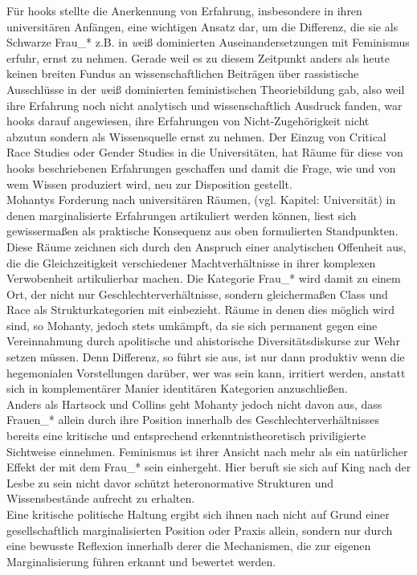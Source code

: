 Für hooks stellte die Anerkennung von Erfahrung, insbesondere in ihren
universitären Anfängen, eine wichtigen Ansatz dar, um die Differenz, die sie
als Schwarze Frau\_* z.B. in \textit{w}eiß dominierten Auseinandersetzungen mit
Feminismus erfuhr, ernst zu nehmen. Gerade weil es zu diesem Zeitpunkt anders
als heute keinen breiten Fundus an wissenschaftlichen Beiträgen über
rassistische Ausschlüsse in der \textit{w}eiß dominierten feministischen Theoriebildung
gab, also weil ihre Erfahrung noch nicht analytisch und wissenschaftlich
Ausdruck fanden, war hooks darauf angewiesen, ihre Erfahrungen von
Nicht-Zugehörigkeit nicht abzutun sondern als Wissensquelle ernst zu
nehmen.\footnotemark {}
Der Einzug von Critical Race Studies oder Gender Studies in die Universitäten,
hat Räume für diese von hooks beschriebenen Erfahrungen geschaffen und damit
die Frage, wie und von wem Wissen produziert wird, neu zur Disposition
gestellt.\footnotemark {} \\

Mohantys Forderung nach universitären Räumen, (vgl. Kapitel: Universität)
in denen marginalisierte Erfahrungen artikuliert werden können, liest sich
gewissermaßen als praktische Konsequenz aus oben formulierten Standpunkten.
Diese Räume zeichnen sich durch den Anspruch einer analytischen Offenheit aus,
die die Gleichzeitigkeit verschiedener Machtverhältnisse in ihrer komplexen
Verwobenheit artikulierbar machen. Die Kategorie Frau\_* wird damit zu einem
Ort, der nicht nur Geschlechterverhältnisse, sondern gleichermaßen Class und
Race als Strukturkategorien mit einbezieht. Räume in denen dies möglich wird
sind, so Mohanty, jedoch stets umkämpft, da sie sich permanent gegen eine
Vereinnahmung durch apolitische und ahistorische Diversitätsdiskurse zur Wehr
setzen müssen. Denn Differenz, so führt sie aus, ist nur dann produktiv wenn
die hegemonialen Vorstellungen darüber, wer was sein kann, irritiert werden,
anstatt sich in komplementärer Manier identitären Kategorien
anzuschließen.\footnotemark {}\\ 

Anders als Hartsock und Collins geht Mohanty jedoch nicht davon aus, dass
Frauen\_* allein durch ihre Position innerhalb des Geschlechterverhältnisses
bereits eine kritische und entsprechend erkenntnistheoretisch priviligierte
Sichtweise einnehmen. Feminismus ist ihrer Ansicht nach mehr als ein
natürlicher Effekt der mit dem Frau\_* sein einhergeht. Hier beruft sie sich auf
King nach der Lesbe zu sein nicht davor schützt heteronormative Strukturen und
Wissensbestände aufrecht zu erhalten. \\
Eine kritische politische Haltung ergibt
sich ihnen nach nicht auf Grund einer gesellschaftlich marginalisierten
Position oder Praxis allein, sondern nur durch eine bewusste Reflexion
innerhalb derer die Mechanismen, die zur eigenen Marginalisierung führen
erkannt und bewertet werden.\footnotemark {}\\

